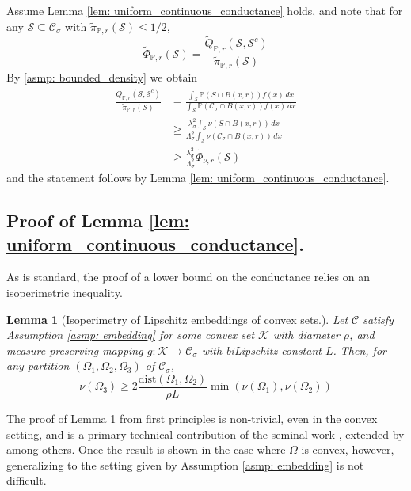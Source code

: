 \documentclass{article}
\newcommand{\1}{\mathbf{1}}
\newcommand{\dist}{\mathrm{dist}}
\newcommand{\Pbb}{\mathbb{P}}
\newcommand{\Sset}{\mathcal{S}}
\newcommand{\Cset}{\mathcal{C}}
\newcommand{\Csig}{\Cset_{\sigma}}
\newcommand{\dx}{\,dx}
\newcommand{\piwt}{\widetilde{\pi}}
\theoremstyle{aldenthm}
\newtheorem{lemma}{Lemma}
\theoremstyle{aldenrmrk}
\begin{document}
Assume Lemma \ref{lem: uniform_continuous_conductance} holds, and note that for any $\Sset \subseteq \Csig$ with $\piwt_{\Pbb,r}(\Sset) \leq 1/2$,
\begin{equation*}
\widetilde{\Phi}_{\Pbb,r}(\Sset) = \frac{\widetilde{Q}_{\Pbb,r}(\Sset,\Sset^c)}{\piwt_{\Pbb,r}(\Sset)}
\end{equation*}
By \ref{asmp: bounded_density} we obtain
\begin{align*}
\frac{\widetilde{Q}_{\Pbb,r}(\Sset,\Sset^c)}{\piwt_{\Pbb,r}(\Sset)} & = \frac{\int_{\Sset} \Pbb(S \cap B(x,r)) f(x) \dx}{\int_{\Sset} \Pbb(\Csig \cap B(x,r)) f(x) \dx} \\
& \geq \frac{\lambda_{\sigma}^2 \int_{\Sset} \nu(S \cap B(x,r)) \dx}{\Lambda_{\sigma}^2 \int_{\Sset} \nu(\Csig \cap B(x,r)) \dx} \\
& \geq \frac{\lambda_{\sigma}^2}{\Lambda_{\sigma}^2} \widetilde{\Phi}_{\nu,r}(\Sset)
\end{align*}
and the statement follows by Lemma \ref{lem: uniform_continuous_conductance}.

\subsection{Proof of Lemma \ref{lem: uniform_continuous_conductance}.}
\label{sec: proof_of_lemma_continuous_conductance}

As is standard, the proof of a lower bound on the conductance relies on an isoperimetric inequality.

\begin{lemma}[Isoperimetry of Lipschitz embeddings of convex sets.]
	\label{lem: nonconvex_isoperimetry}
	Let $\Cset$ satisfy Assumption \ref{asmp: embedding} for some convex set $\mathcal{K}$ with diameter $\rho$, and measure-preserving mapping $g: \mathcal{K} \to \Csig$ with biLipschitz constant $L$. Then, for any partition $(\Omega_1,\Omega_2,\Omega_3)$ of $\Csig$, 
	\begin{equation*}
	\nu(\Omega_3) \geq 2\frac{\dist(\Omega_1, \Omega_2)}{\rho L} \min(\nu(\Omega_1), \nu(\Omega_2))
	\end{equation*}
\end{lemma}
The proof of Lemma \ref{lem: nonconvex_isoperimetry} from first principles is non-trivial, even in the convex setting, and is a primary technical contribution of the seminal work \cite{lovasz1990}, extended by \cite{dyer1991} among others. 
Once the result is shown in the case where $\Omega$ is convex, however, generalizing to the setting given by  Assumption \ref{asmp: embedding} is not difficult.
\end{document}
